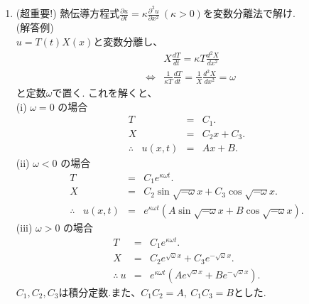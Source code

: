 \documentclass[11pt]{jsarticle}
\begin{document}
\begin{enumerate}
\newpage
\item (超重要!) 熱伝導方程式$\displaystyle{\frac{\partial u}{\partial t} =
\kappa \frac{\partial^2 u}{\partial x^2}~(\kappa >0)}$を変数分離法で解け.\\
(解答例)\\[8pt]
$u=T(t)X(x)$と変数分離し、
\begin{eqnarray*}
&&X\frac{d T}{d t} = \kappa T \frac{d^2 X}{d x^2} \\[5pt]
&\Leftrightarrow& \frac{1}{\kappa T}\frac{d T}{d t} =
\frac{1}{X} \frac{d^2 X}{d x^2} = \omega
\end{eqnarray*}
と定数$\omega$で置く.
これを解くと、\\[12pt]
%
(i) $\omega=0$ の場合
%
\begin{eqnarray*}
T &=& C_1. \\
X &=& C_2x+C_3. \\
\therefore \;\;\; u(x,t) &=& Ax+B.
\end{eqnarray*}
%
(ii) $\omega<0$ の場合
%
\begin{eqnarray*}
T &=& C_1e^{\kappa \omega t}. \\
X &=& C_2\sin\sqrt{-\omega}x+C_3\cos\sqrt{-\omega}x. \\
\therefore \;\;\; u(x,t) &=&
e^{\kappa \omega t}\left(A\sin\sqrt{-\omega}x+B\cos\sqrt{-\omega}x\right).
%
\end{eqnarray*}
%
(iii) $\omega>0$ の場合
%
\begin{eqnarray*}
 T &=& C_1 e^{\kappa\omega t}.\\
 X &=& C_2 e^{\sqrt\omega x} + C_3 e^{-\sqrt\omega x}.\\
 \therefore \ u &=&
e^{\kappa\omega t} \left(A e^{\sqrt\omega x} + B e^{-\sqrt\omega x} \right).
\end{eqnarray*}
%
$C_1,C_2,C_3$は積分定数.また、$C_1C_2=A, \ C_1C_3=B$とした.\\


\end{enumerate}
\end{document}

